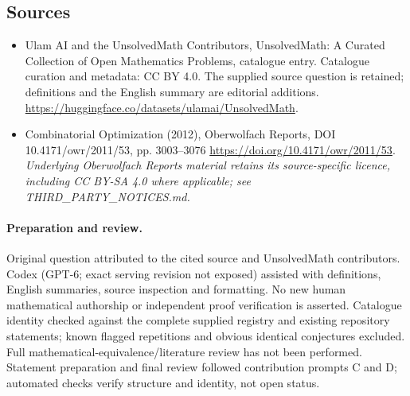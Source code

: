 \documentclass[11pt]{article}
\begin{document}
\subsection{Sources}
\begin{itemize}
\item[\hypertarget{source:statement:1}{S1}] Ulam AI and the UnsolvedMath Contributors, UnsolvedMath: A Curated Collection of Open Mathematics Problems, catalogue entry. Catalogue curation and metadata: CC BY 4.0. The supplied source question is retained; definitions and the English summary are editorial additions.
\url{https://huggingface.co/datasets/ulamai/UnsolvedMath}.
\item[\hypertarget{source:statement:2}{S2}] Combinatorial Optimization (2012), Oberwolfach Reports, DOI 10.4171/owr/2011/53, pp. 3003--3076
\url{https://doi.org/10.4171/owr/2011/53}.
\textit{Underlying Oberwolfach Reports material retains its source-specific licence, including CC BY-SA 4.0 where applicable; see THIRD\_PARTY\_NOTICES.md.}
\end{itemize}
\paragraph{Preparation and review.}
Original question attributed to the cited source and UnsolvedMath contributors. Codex (GPT-6; exact serving revision not exposed) assisted with definitions, English summaries, source inspection and formatting. No new human mathematical authorship or independent proof verification is asserted. Catalogue identity checked against the complete supplied registry and existing repository statements; known flagged repetitions and obvious identical conjectures excluded. Full mathematical-equivalence/literature review has not been performed. Statement preparation and final review followed contribution prompts C and D; automated checks verify structure and identity, not open status.
\label{end:statement}
\end{document}
